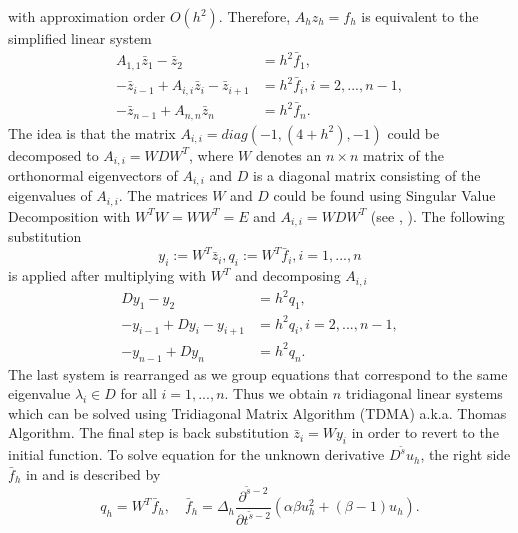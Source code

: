 \documentclass[11pt,a4paper,twoside]{article}
\begin{document}
with approximation order $O(h^2)$. Therefore, $A_h z_h = f_h$ is equivalent to the simplified linear system
\begin{align}
A_{1,1}\bar z_1 - \bar z_2 &= h^2\bar f_1, \nonumber \\
- \bar z_{i-1}  + A_{i,i}\bar z_i - \bar z_{i+1}  &= h^2\bar f_i, i = 2,...,n-1, \nonumber \\
- \bar z_{n-1} + A_{n,n}\bar z_n &= h^2\bar f_n.\label{LinSys}
\end{align}
The idea is that the matrix $A_{i,i} = diag(-1, (4+h^2), -1)$ could be decomposed to $A_{i,i}  = W D W^T$, where $W$ denotes an $n \times n$ matrix of the orthonormal eigenvectors of $A_{i,i} $ and $ D$ is a diagonal matrix consisting of the eigenvalues of $A_{i,i}$. The matrices $W$ and $D$ could be found using Singular Value Decomposition with $W^T W = W W^T = E$ and $A_{i,i} = WDW^T$ (see \cite{Tref}, \cite{FPS}). The following substitution 
\begin{equation}\label{subst}
y_i := W^T \bar z_i, q_i := W^T \bar f_i, i = 1, ...,n
\end{equation}
is applied after multiplying  with $W^T$ and decomposing $A_{i,i}$
\begin{align}
Dy_1 - y_2 &= h^2 q_1,\nonumber \\
-y_{i-1} + D y_i - y_{i+1} &= h^2 q_i, i = 2,...,n-1,\nonumber \\
- y_{n-1} + Dy_n &= h^2 q_n.\label{SubSys}
\end{align}
The last system  is rearranged as we group equations that correspond to the same eigenvalue $\lambda_i \in D$ for all $i = 1,...,n$. Thus we obtain $n$ tridiagonal linear systems which can be solved using Tridiagonal Matrix Algorithm (TDMA) a.k.a. Thomas Algorithm. The final step is back substitution $\bar z_i = W y_i$ in order to revert to the initial function. To solve equation  for the unknown derivative $D^{\tilde s}u_h$, the right side $\bar f_h$  in  and  is described by
$$
q_h = W^T \bar f_h, \quad \bar f_h = \Delta_h \frac{ \partial^{ \tilde s - 2 } } { \partial t^{ \tilde s - 2 } } ( \alpha \beta u_h^2  + (\beta -1)u_h).
$$

\end{document}
